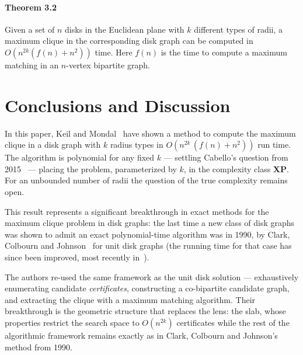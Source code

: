 \documentclass[12pt]{article}
\begin{document}
\paragraph{Theorem 3.2} Given a set of $n$ disks in the Euclidean plane with $k$ different types of radii, a maximum clique in the corresponding disk graph can be computed in $O\!\left(n^{2k}(f(n) + n^2)\right)$ time. Here $f(n)$ is the time to compute a maximum matching in an $n$-vertex bipartite graph.
\section{Conclusions and Discussion}\label{sec:conclusions}
In this paper, Keil and Mondal~\cite{keil2025clique} have shown a method to compute the maximum clique in a disk graph
with $k$ radius types in $O\!\left(n^{2k}\,(f(n) + n^2)\right)$ run time.
The algorithm is polynomial for any fixed $k$ --- settling Cabello's question from 2015~\cite{cabello2015open} ---
placing the problem, parameterized by $k$, in the complexity class \textbf{XP}.
For an unbounded number of radii the question of the true complexity remains open.

This result represents a significant breakthrough in exact methods for the maximum clique problem
in disk graphs: the last time a new class of disk graphs was shown to admit an exact polynomial-time
algorithm was in 1990, by Clark, Colbourn and Johnson~\cite{clark1990udg} for unit disk graphs (the running time for that case has since been improved, most recently in~\cite{espenant2023socg}).

The authors re-used the same framework as the unit disk solution --- exhaustively enumerating candidate
\textit{certificates}, constructing a co-bipartite candidate graph, and extracting the clique with a maximum
matching algorithm. Their breakthrough is the geometric structure that replaces the lens: the slab, whose
properties restrict the search space to $O(n^{2k})$ certificates while the rest of the algorithmic framework
remains exactly as in Clark, Colbourn and Johnson's method from 1990.
\end{document}
